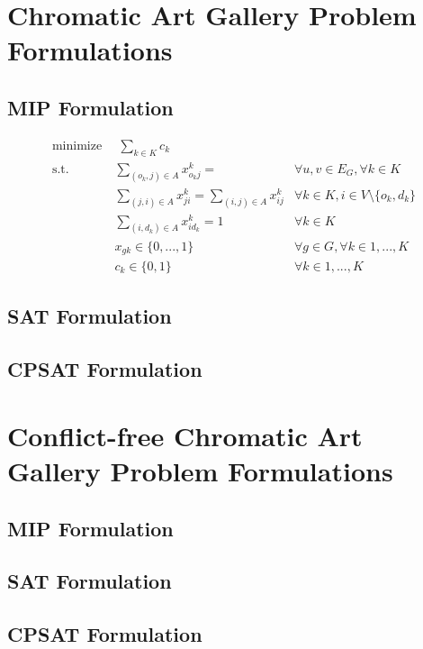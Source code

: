 \chapter{Chromatic Art Gallery Problem Formulations}

\section{MIP Formulation}

\begin{align}
\label{eq:f.0} \mbox{minimize}~& \;\sum_{k\in K} c_{k}& \\
\label{eq:f.1} \mbox{s.t. } &\sum_{(o_k,j)\in A}x_{o_kj}^{k}=  & \forall u,v \in E_{G}, \forall k\in K\\
\label{eq:f.2}&\sum_{(j,i)\in A}x_{ji}^{k}=\sum_{(i,j)\in A}x_{ij}^{k} & \forall k\in K, i\in V \setminus \{o_k,d_k\}\\
\label{eq:f.3}&\sum_{(i,d_k)\in A}x_{id_k}^{k}=1 & \forall k \in K\\
\label{eq:f.4}& x_{gk} \in \{0,...,1\} & \forall g \in G, \forall k \in {1,...,K}\\
\label{eq:f.5}& c_{k} \in \{0,1\} & \forall k\in {1,...,K}
\end{align}

\section{SAT Formulation}

\section{CPSAT Formulation}

\chapter{Conflict-free Chromatic Art Gallery Problem Formulations}

\section{MIP Formulation}

\section{SAT Formulation}

\section{CPSAT Formulation}

